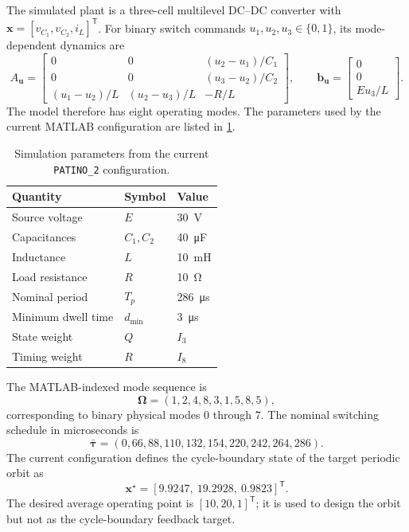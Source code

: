 \documentclass[11pt]{article}
\newcommand{\vect}[1]{\bm{#1}}
\begin{document}
The simulated plant is a three-cell multilevel DC--DC converter with
$\vect{x}=[v_{C_1},v_{C_2},i_L]^{\mathsf T}$. For binary switch commands
$u_1,u_2,u_3\in\{0,1\}$, its mode-dependent dynamics are
\begin{equation}
A_{\vect{u}}=
\begin{bmatrix}
0 & 0 & (u_2-u_1)/C_1\\
0 & 0 & (u_3-u_2)/C_2\\
(u_1-u_2)/L & (u_2-u_3)/L & -R/L
\end{bmatrix},
\qquad
\vect{b}_{\vect{u}}=
\begin{bmatrix}
0\\0\\Eu_3/L
\end{bmatrix}.
\label{eq:converter}
\end{equation}
The model therefore has eight operating modes. The parameters used by the current MATLAB configuration are listed in \cref{tab:parameters}.

\begin{table}[ht]
    \centering
    \caption{Simulation parameters from the current \texttt{PATINO\_2} configuration.}
    \label{tab:parameters}
    \begin{tabular}{lll}
        \toprule
        Quantity & Symbol & Value \\
        \midrule
        Source voltage & $E$ & \SI{30}{\volt} \\
        Capacitances & $C_1,C_2$ & \SI{40}{\micro\farad} \\
        Inductance & $L$ & \SI{10}{\milli\henry} \\
        Load resistance & $R$ & \SI{10}{\ohm} \\
        Nominal period & $T_p$ & \SI{286}{\micro\second} \\
        Minimum dwell time & $d_{\min}$ & \SI{3}{\micro\second} \\
        State weight & $Q$ & $I_3$ \\
        Timing weight & $R$ & $I_8$ \\
        \bottomrule
    \end{tabular}
\end{table}

The MATLAB-indexed mode sequence is
\begin{equation}
    \bm{\Omega}=(1,2,4,8,3,1,5,8,5),
\end{equation}
corresponding to binary physical modes $0$ through $7$. The nominal switching schedule in microseconds is
\begin{equation}
    \bar{\vect{\tau}}=
    (0,66,88,110,132,154,220,242,264,286).
\end{equation}
The current configuration defines the cycle-boundary state of the target periodic orbit as
\begin{equation}
    \vect{x}^{\star}=
    [9.9247,\ 19.2928,\ 0.9823]^{\mathsf T}.
\end{equation}
The desired average operating point is $[10,20,1]^{\mathsf T}$; it is used to design the orbit but not as the cycle-boundary feedback target.
\end{document}

